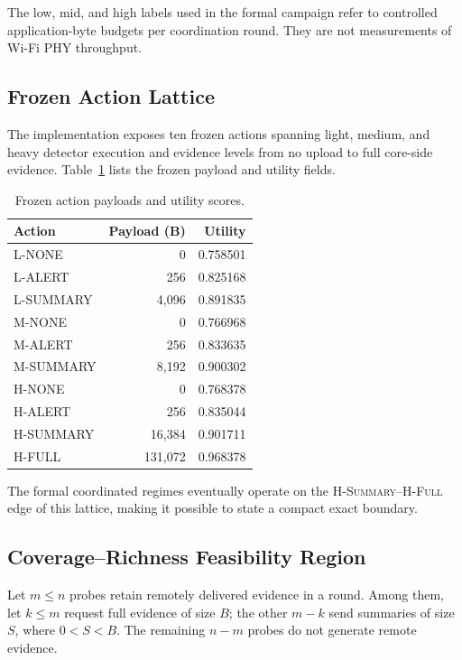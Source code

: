\documentclass[10pt,journal]{IEEEtran}
\newcommand{\Hsummary}{\textsc{H-Summary}}
\newcommand{\Hfull}{\textsc{H-Full}}
\begin{document}
The low, mid, and high labels used in the formal campaign refer to
controlled application-byte budgets per coordination round. They are
not measurements of Wi-Fi PHY throughput.

\subsection{Frozen Action Lattice}

The implementation exposes ten frozen actions spanning light, medium,
and heavy detector execution and evidence levels from no upload to full
core-side evidence. Table~\ref{tab:actions} lists the frozen payload and
utility fields.

\begin{table}[t]
\centering
\caption{Frozen action payloads and utility scores.}
\label{tab:actions}
\scriptsize
\begin{tabular}{@{}lrr@{}}
\toprule
Action & Payload (B) & Utility \\
\midrule
L-NONE    & 0      & 0.758501 \\
L-ALERT   & 256    & 0.825168 \\
L-SUMMARY & 4,096  & 0.891835 \\
M-NONE    & 0      & 0.766968 \\
M-ALERT   & 256    & 0.833635 \\
M-SUMMARY & 8,192  & 0.900302 \\
H-NONE    & 0      & 0.768378 \\
H-ALERT   & 256    & 0.835044 \\
H-SUMMARY & 16,384 & 0.901711 \\
H-FULL    & 131,072& 0.968378 \\
\bottomrule
\end{tabular}
\end{table}

The formal coordinated regimes eventually operate on the
\Hsummary--\Hfull{} edge of this lattice, making it possible to state a
compact exact boundary.

\subsection{Coverage--Richness Feasibility Region}

Let $m\leq n$ probes retain remotely delivered evidence in a round.
Among them, let $k\leq m$ request full evidence of size $B$; the other
$m-k$ send summaries of size $S$, where $0<S<B$.
The remaining $n-m$ probes do not generate remote evidence.
\end{document}
